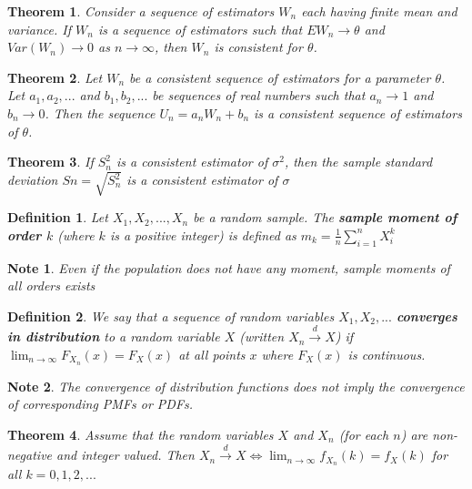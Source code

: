 \documentclass[14pt,twoside]{extreport}
\theoremstyle{dotless}
\newtheorem*{defn}{Definition}
\newtheorem*{thm}{Theorem} %
\newtheorem*{note}{Note} %
\begin{document}
\begin{thm}
    Consider a sequence of estimators $W_n$ each having finite mean and variance. If $W_n$ is a sequence of estimators such that $EW_n \to \theta$ and $Var(W_n) \to 0$ as $n \to \infty$, then $W_n$ is consistent for $\theta$.
\end{thm}

\begin{thm}
    Let $W_n$ be a consistent sequence of estimators for a parameter $\theta$. Let $a_1, a_2, ...$ and $b_1, b_2, ...$ be sequences of real numbers such that $a_n \to 1$ and $b_n \to 0$. Then the sequence $U_n = a_n W_n + b_n$ is a consistent sequence of estimators of $\theta$.
\end{thm}

\begin{thm}
    If $S_n^2$ is a consistent estimator of $\sigma^2$, then the sample standard deviation $Sn = \sqrt{S_n^2}$ is a consistent estimator of $\sigma$
\end{thm}

\begin{defn}
    Let $X_1, X_2, ..., X_n$ be a random sample. The \textbf{sample moment of order $k$} (where $k$ is a positive integer) is defined as $m_k = \frac{1}{n} \sum_{i=1}^n X_i^k$
\end{defn}

\begin{note}
    Even if the population does not have any moment, sample moments of all orders exists
\end{note}

\begin{defn}
    We say that a sequence of random variables $X_1, X_2, ...$ \textbf{converges in distribution} to a random variable $X$ (written $X_n \overset{d}{\to} X$) if $\lim_{n \to \infty} F_{X_n}(x) = F_X(x)$ at all points $x$ where $F_X(x)$ is continuous.
\end{defn}

\begin{note}
    The convergence of distribution functions does not imply the convergence of corresponding PMFs or PDFs.
\end{note}

\begin{thm}
    Assume that the random variables $X$ and $X_n$ (for each $n$) are non-negative and integer valued. Then $X_n \overset{d}{\to} X \iff \lim_{n \to \infty} f_{X_n} (k) = f_X(k)$ for all $k = 0, 1, 2, ...$
\end{thm}
\end{document}
